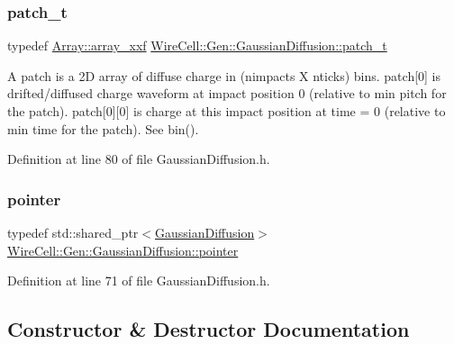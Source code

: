 \subsubsection{\texorpdfstring{patch\+\_\+t}{patch\_t}}
{\footnotesize\ttfamily typedef \hyperlink{namespace_wire_cell_1_1_array_ab565fef5e33632bb02f0ed4be803020c}{Array\+::array\+\_\+xxf} \hyperlink{class_wire_cell_1_1_gen_1_1_gaussian_diffusion_a33cd8c39349ac40f3757405be6d8f7b0}{Wire\+Cell\+::\+Gen\+::\+Gaussian\+Diffusion\+::patch\+\_\+t}}

A patch is a 2D array of diffuse charge in (nimpacts X nticks) bins. patch\mbox{[}0\mbox{]} is drifted/diffused charge waveform at impact position 0 (relative to min pitch for the patch). patch\mbox{[}0\mbox{]}\mbox{[}0\mbox{]} is charge at this impact position at time = 0 (relative to min time for the patch). See {\ttfamily bin()}. 

Definition at line 80 of file Gaussian\+Diffusion.\+h.

\mbox{\label{class_wire_cell_1_1_gen_1_1_gaussian_diffusion_ac7fce7070c18877fa61abc26ad410ce9}} 
\subsubsection{\texorpdfstring{pointer}{pointer}}
{\footnotesize\ttfamily typedef std\+::shared\+\_\+ptr$<$\hyperlink{class_wire_cell_1_1_gen_1_1_gaussian_diffusion}{Gaussian\+Diffusion}$>$ \hyperlink{class_wire_cell_1_1_gen_1_1_gaussian_diffusion_ac7fce7070c18877fa61abc26ad410ce9}{Wire\+Cell\+::\+Gen\+::\+Gaussian\+Diffusion\+::pointer}}



Definition at line 71 of file Gaussian\+Diffusion.\+h.



\subsection{Constructor \& Destructor Documentation}
\mbox{\label{class_wire_cell_1_1_gen_1_1_gaussian_diffusion_a1c53023e228cad69ccc12b9133ade785}} 
